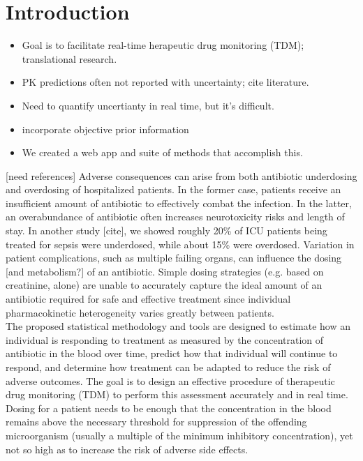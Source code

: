 \documentclass{article}
\begin{document}

\section{Introduction}
\begin{itemize}
\item Goal is to facilitate real-time herapeutic drug monitoring (TDM); translational research.
\item PK predictions often not reported with uncertainty; cite literature.
\item Need to quantify uncertianty in real time, but it's difficult.
\item incorporate objective prior information
\item We created a web app and suite of methods that accomplish this.
\end{itemize}

[need references]
Adverse consequences can arise from both antibiotic underdosing and overdosing  of hospitalized patients. In the former case, patients receive an insufficient amount of antibiotic to effectively combat the infection. In the latter, an overabundance of antibiotic often increases neurotoxicity risks and length of stay. In another study [cite], we showed roughly 20\% of ICU patients being treated for sepsis were underdosed, while about 15\% were overdosed.  Variation in patient complications, such as multiple failing organs, can influence the dosing [and metabolism?] of an antibiotic. Simple dosing strategies (e.g. based on creatinine, alone) are unable to accurately capture the ideal amount of an antibiotic required for safe and effective treatment since individual pharmacokinetic heterogeneity varies greatly between patients.\\

The proposed statistical methodology and tools are designed to estimate how an individual is responding to treatment as measured by the concentration of antibiotic in the blood over time, predict how that individual will continue to respond, and determine how treatment can be adapted to reduce the risk of adverse outcomes.  The goal is to design an effective procedure of therapeutic drug monitoring (TDM) to perform this assessment accurately and in real time. Dosing for a patient needs to be enough that the concentration in the blood remains above the necessary threshold for suppression of the offending microorganism (usually a multiple of the minimum inhibitory concentration), yet not so high as to increase the risk of adverse side effects.\\
[do we need to mention or refrain from mentioning that the plan for a crossover study is in the works]\\
\end{document}
